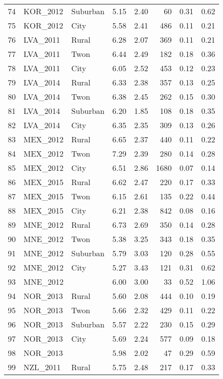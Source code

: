 \documentclass[12pt, titlepage]{article}
\begin{document}
\begin{table}[ht]
\begin{tabular}{rllrrrrr}
		74 & KOR\_2012 & Suburban & 5.15 & 2.40 &  60 & 0.31 & 0.62 \\ 
		75 & KOR\_2012 & City & 5.58 & 2.41 & 486 & 0.11 & 0.21 \\ 
		76 & LVA\_2011 & Rural & 6.28 & 2.07 & 369 & 0.11 & 0.21 \\ 
		77 & LVA\_2011 & Twon & 6.44 & 2.49 & 182 & 0.18 & 0.36 \\ 
		78 & LVA\_2011 & City & 6.05 & 2.52 & 453 & 0.12 & 0.23 \\ 
		79 & LVA\_2014 & Rural & 6.33 & 2.38 & 357 & 0.13 & 0.25 \\ 
		80 & LVA\_2014 & Twon & 6.38 & 2.45 & 262 & 0.15 & 0.30 \\ 
		81 & LVA\_2014 & Suburban & 6.20 & 1.85 & 108 & 0.18 & 0.35 \\ 
		82 & LVA\_2014 & City & 6.35 & 2.35 & 309 & 0.13 & 0.26 \\ 
		83 & MEX\_2012 & Rural & 6.65 & 2.37 & 440 & 0.11 & 0.22 \\ 
		84 & MEX\_2012 & Twon & 7.29 & 2.39 & 280 & 0.14 & 0.28 \\ 
		85 & MEX\_2012 & City & 6.51 & 2.86 & 1680 & 0.07 & 0.14 \\ 
		86 & MEX\_2015 & Rural & 6.62 & 2.47 & 220 & 0.17 & 0.33 \\ 
		87 & MEX\_2015 & Twon & 6.15 & 2.61 & 135 & 0.22 & 0.44 \\ 
		88 & MEX\_2015 & City & 6.21 & 2.38 & 842 & 0.08 & 0.16 \\ 
		89 & MNE\_2012 & Rural & 6.73 & 2.69 & 350 & 0.14 & 0.28 \\ 
		90 & MNE\_2012 & Twon & 5.38 & 3.25 & 343 & 0.18 & 0.35 \\ 
		91 & MNE\_2012 & Suburban & 5.79 & 3.03 & 120 & 0.28 & 0.55 \\ 
		92 & MNE\_2012 & City & 5.27 & 3.43 & 121 & 0.31 & 0.62 \\ 
		93 & MNE\_2012 &  & 6.00 & 3.00 &  33 & 0.52 & 1.06 \\ 
		94 & NOR\_2013 & Rural & 5.60 & 2.08 & 444 & 0.10 & 0.19 \\ 
		95 & NOR\_2013 & Twon & 5.66 & 2.32 & 429 & 0.11 & 0.22 \\ 
		96 & NOR\_2013 & Suburban & 5.57 & 2.22 & 230 & 0.15 & 0.29 \\ 
		97 & NOR\_2013 & City & 5.69 & 2.24 & 577 & 0.09 & 0.18 \\ 
		98 & NOR\_2013 &  & 5.98 & 2.02 &  47 & 0.29 & 0.59 \\ 
		99 & NZL\_2011 & Rural & 5.75 & 2.48 & 217 & 0.17 & 0.33 \\ 

\end{tabular}
\end{table}
\end{document}
